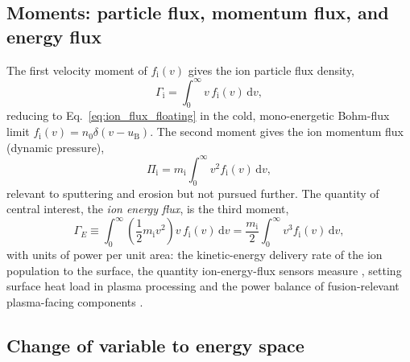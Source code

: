 \subsection{Moments: particle flux, momentum flux, and energy flux}

The first velocity moment of $f_{\mathrm{i}}(v)$ gives the ion particle flux density,
\begin{equation}
\Gamma_{\mathrm{i}} = \int_{0}^{\infty} v\,f_{\mathrm{i}}(v)\,\mathrm{d}v,
\label{appA-eq:moment1}
\end{equation}
reducing to Eq.~\eqref{eq:ion_flux_floating} in the cold, mono-energetic Bohm-flux limit $f_{\mathrm{i}}(v) = n_{0}\delta(v-u_{\mathrm{B}})$. The second moment gives the ion momentum flux (dynamic pressure),
\begin{equation}
\Pi_{\mathrm{i}} = m_{\mathrm{i}}\int_{0}^{\infty} v^{2}f_{\mathrm{i}}(v)\,\mathrm{d}v,
\label{appA-eq:moment2}
\end{equation}
relevant to sputtering and erosion but not pursued further. The quantity of central interest, the \emph{ion energy flux}, is the third moment,
\begin{equation}
\boxed{\Gamma_{E} \equiv \int_{0}^{\infty} \left(\frac{1}{2}m_{\mathrm{i}}v^{2}\right)v\,f_{\mathrm{i}}(v)\,\mathrm{d}v = \frac{m_{\mathrm{i}}}{2}\int_{0}^{\infty} v^{3}f_{\mathrm{i}}(v)\,\mathrm{d}v},
\label{eq:energy_flux}
\end{equation}
with units of power per unit area: the kinetic-energy delivery rate of the ion population to the surface, the quantity ion-energy-flux sensors measure \cite{ref0075,ref0080}, setting surface heat load in plasma processing \cite{ref0080} and the power balance of fusion-relevant plasma-facing components \cite{ref0093}.

\subsection{Change of variable to energy space}

